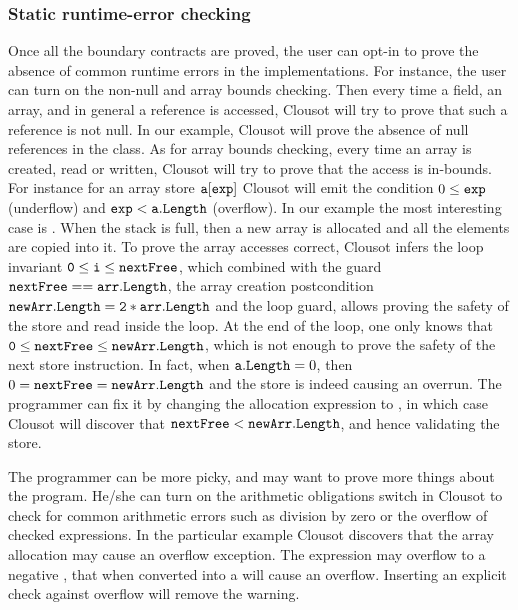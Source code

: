 \documentclass{llncs}
\begin{document}
\subsubsection{Static runtime-error checking}
Once all the boundary contracts are proved, the user can opt-in to
prove the absence of common runtime errors in the implementations.
For instance, the user can turn on the non-null and array bounds
checking.  Then every time a field, an array, and in general a
reference is accessed, Clousot will try to prove that such a reference
is not null.  In our example, Clousot will prove the absence of null
references in the class.  As for array bounds checking, every time an
array is created, read or written, Clousot will try to prove that the
access is in-bounds.  For instance for an array store $\mathtt{a[exp]}$
Clousot will emit the condition $0 \leq \mathtt{exp}$ (underflow) and
$\mathtt{exp} < \mathtt{a.Length}$ (overflow).  In our example the most
interesting case is .  When the stack is full, then a new
array is allocated and all the elements are copied into it.  To prove
the array accesses correct, Clousot infers the loop invariant
$\mathtt{0} \leq \mathtt{i} \leq \mathtt{nextFree}$, which combined with the
guard $\mathtt{nextFree == arr.Length}$, the array creation
postcondition $\mathtt{newArr.Length = 2 * arr.Length}$ and the loop
guard, allows proving the safety of the  store and
 read inside the loop.  At the end of the loop, one only knows that
$\mathtt{0} \leq \mathtt{nextFree} \leq \mathtt{newArr.Length}$, which is
not enough to prove the safety of the next store instruction.  In
fact, when $\mathtt{a.Length} = 0$, then $0 = \mathtt{nextFree} =
\mathtt{newArr.Length}$ and the store is indeed causing an overrun.  The programmer can
fix it by changing the allocation expression to , in which case Clousot will discover that $\mathtt{nextFree} <
\mathtt{newArr.Length}$, and hence validating the store.

The programmer can be more picky, and may want to prove more things about the program.
He/she can turn on the arithmetic obligations switch in Clousot to check for common  arithmetic errors such  as division by zero or the overflow of checked expressions.
In the particular example Clousot discovers that the array allocation  may cause an overflow exception.
The expression  may overflow to a negative , that when converted into a  will cause an overflow.
Inserting an explicit check against overflow will remove the warning.
\end{document}
